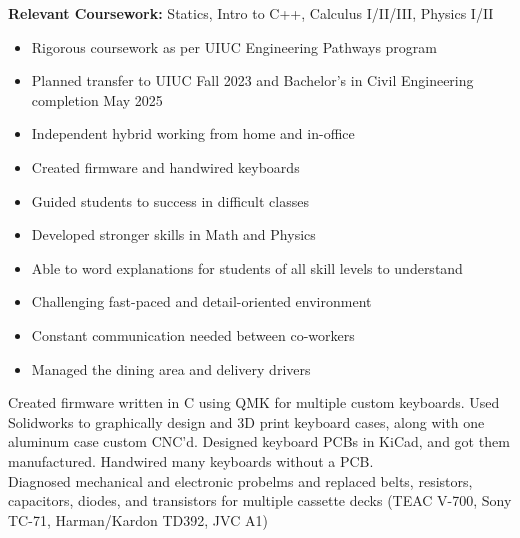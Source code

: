\documentclass[10pt,a4paper,ragged2e,withhyper]{altacv}
\begin{document}


\makecvheader


\begin{paracol}{2}

\textbf{Relevant Coursework:} Statics, Intro to C++, Calculus I/II/III, Physics I/II\\
\begin{itemize}
	\item Rigorous coursework as per UIUC Engineering Pathways program
	\item Planned transfer to UIUC Fall 2023 and Bachelor's in Civil Engineering completion May 2025
\end{itemize}


	\begin{itemize}
		\item Independent hybrid working from home and in-office
		\item Created firmware and handwired keyboards
	\end{itemize}
	\divider
{}
	\begin{itemize}
		\item Guided students to success in difficult classes
		\item Developed stronger skills in Math and Physics
		\item Able to word explanations for students of all skill levels to understand
	\end{itemize}
	\divider
{}
	\begin{itemize}
		\item Challenging fast-paced and detail-oriented environment
		\item Constant communication needed between co-workers 
		\item Managed the dining area and delivery drivers
	\end{itemize}
	Created firmware written in C using QMK for multiple custom keyboards. Used Solidworks to graphically design and 3D print keyboard cases, along with one aluminum case custom CNC'd. Designed keyboard PCBs in KiCad, and got them manufactured. Handwired many keyboards without a PCB.\\
\divider
{}
	Diagnosed mechanical and electronic probelms and replaced belts, resistors, capacitors, diodes, and transistors for multiple cassette decks (TEAC V-700, Sony TC-71, Harman/Kardon TD392, JVC A1)\\
\switchcolumn
{}


\end{paracol}
\end{document}
